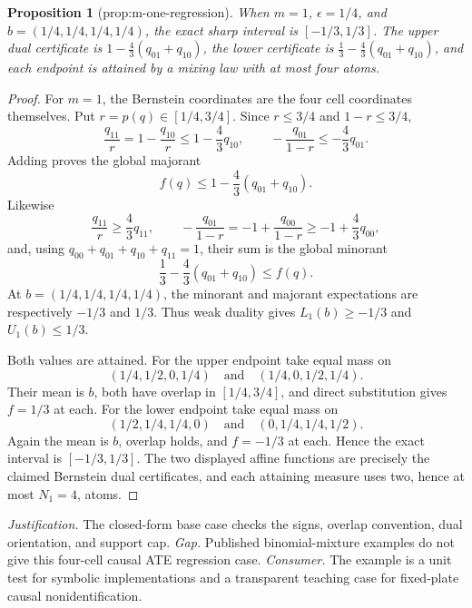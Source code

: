 \documentclass{article}
\newtheorem{proposition}{Proposition}
\begin{document}
\begin{proposition}[prop:m-one-regression]\label{prop:m-one-regression}
When \(m=1\), \(\epsilon=1/4\), and \(b=(1/4,1/4,1/4,1/4)\), the exact sharp interval is \([-1/3,1/3]\). The upper dual certificate is \(1-\frac43(q_{01}+q_{10})\), the lower certificate is \(\frac13-\frac43(q_{01}+q_{10})\), and each endpoint is attained by a mixing law with at most four atoms.
\end{proposition}
\begin{proof}
For \(m=1\), the Bernstein coordinates are the four cell coordinates themselves.  Put \(r=p(q)\in[1/4,3/4]\).  Since \(r\leq3/4\) and \(1-r\leq3/4\),
\[
 \frac{q_{11}}r=1-\frac{q_{10}}r\leq1-\frac43q_{10},
 \qquad
 -\frac{q_{01}}{1-r}\leq-\frac43q_{01}.
\]
Adding proves the global majorant
\[
 f(q)\leq 1-\frac43(q_{01}+q_{10}).
\]
Likewise
\[
 \frac{q_{11}}r\geq\frac43q_{11},
 \qquad
 -\frac{q_{01}}{1-r}=-1+\frac{q_{00}}{1-r}\geq-1+\frac43q_{00},
\]
and, using \(q_{00}+q_{01}+q_{10}+q_{11}=1\), their sum is the global minorant
\[
 \frac13-\frac43(q_{01}+q_{10})\leq f(q).
\]
At \(b=(1/4,1/4,1/4,1/4)\), the minorant and majorant expectations are respectively \(-1/3\) and \(1/3\).  Thus weak duality gives \(L_1(b)\geq-1/3\) and \(U_1(b)\leq1/3\).

Both values are attained.  For the upper endpoint take equal mass on
\[
 (1/4,1/2,0,1/4)
 \quad\text{and}\quad
 (1/4,0,1/2,1/4).
\]
Their mean is \(b\), both have overlap in \([1/4,3/4]\), and direct substitution gives \(f=1/3\) at each.  For the lower endpoint take equal mass on
\[
 (1/2,1/4,1/4,0)
 \quad\text{and}\quad
 (0,1/4,1/4,1/2).
\]
Again the mean is \(b\), overlap holds, and \(f=-1/3\) at each.  Hence the exact interval is \([-1/3,1/3]\).  The two displayed affine functions are precisely the claimed Bernstein dual certificates, and each attaining measure uses two, hence at most \(N_1=4\), atoms.
\end{proof}
\par\smallskip\noindent \textit{Justification.} The closed-form base case checks the signs, overlap convention, dual orientation, and support cap. \textit{Gap.} Published binomial-mixture examples do not give this four-cell causal ATE regression case. \textit{Consumer.} The example is a unit test for symbolic implementations and a transparent teaching case for fixed-plate causal nonidentification.
\end{document}
